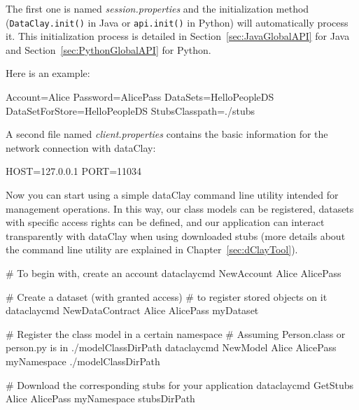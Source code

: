 The first one is named \textit{session.properties} and the initialization method (\texttt{DataClay.init()} in Java or \texttt{api.init()} in Python) will automatically process it. This initialization process is detailed in Section~\ref{sec:JavaGlobalAPI} for Java and Section~\ref{sec:PythonGlobalAPI} for Python.

Here is an example:

\begin{tBox}
\begin{bash}
Account=Alice
Password=AlicePass
DataSets=HelloPeopleDS
DataSetForStore=HelloPeopleDS
StubsClasspath=./stubs
\end{bash}
\end{tBox}

A second file named \textit{client.properties} contains the basic information for the network connection with dataClay:

\begin{tBox}
\begin{bash}
HOST=127.0.0.1
PORT=11034
\end{bash}
\end{tBox}

Now you can start using a simple dataClay command line utility intended for management operations. In this way, our class models can be registered, datasets with specific access rights can be defined, and our application can interact transparently with dataClay when using downloaded stubs (more details about the command line utility are explained in Chapter~\ref{sec:dClayTool}).

\begin{minipage}{\linewidth}
\begin{tBox}
\begin{bash}
 # To begin with, create an account
dataclaycmd NewAccount Alice AlicePass
 
 # Create a dataset (with granted access) 
 # to register stored objects on it
dataclaycmd NewDataContract Alice AlicePass myDataset
 
 # Register the class model in a certain namespace
 # Assuming Person.class or person.py is in ./modelClassDirPath
dataclaycmd NewModel Alice AlicePass myNamespace ./modelClassDirPath \
  <java | python>
 
 # Download the corresponding stubs for your application
dataclaycmd GetStubs Alice AlicePass myNamespace stubsDirPath
\end{bash}
\end{tBox}
\end{minipage}

